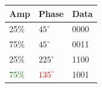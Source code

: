 \documentclass[]{beamer}
\begin{document}
\begin{frame}
\begin{columns}[T]
\begin{column}[T]{5cm}
        \end{column}
        \begin{column}[T]{5cm}
            \begin{table}[]
                \begin{tabular}{lll}
                    Amp  & Phase & Data \\
                    \hline
                    25\% & $45^{\circ}$  & 0000 \\
                    75\% & $45^{\circ}$  & 0011 \\
                    25\% & $225^{\circ}$ & 1100 \\
                    \textcolor{green}{75\%} & \textcolor{red}{$135^{\circ}$} & \textcolor{cyan!50}{1001} \\
                \end{tabular}
            \end{table}
        \end{column}
    \end{columns}
\end{frame}
\end{document}
